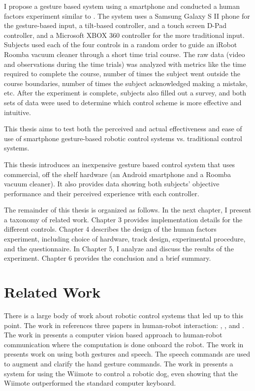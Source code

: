 \documentclass[12pt, letterpaper]{report}
\begin{document}
I propose a gesture based system using a smartphone and conducted a human factors experiment similar to \cite{Varcholik_Barber_Nicholson_2008}. The system uses a Samsung Galaxy S II phone for the gesture-based input, a tilt-based controller, and a touch screen D-Pad controller, and a Microsoft XBOX 360 controller for the more traditional input. Subjects used each of the four controls in a random order to guide an iRobot Roomba vacuum cleaner through a short time trial course. The raw data (video and observations during the time trials) was analyzed with metrics like the time required to complete the course, number of times the subject went outside the course boundaries, number of times the subject acknowledged making a mistake, etc. After the experiment is complete, subjects also filled out a survey, and both sets of data were used to determine which control scheme is more effective and intuitive. 

This thesis aims to test both the perceived and actual effectiveness and ease of use of smartphone gesture-based robotic control systems vs. traditional control systems.

This thesis introduces an inexpensive gesture based control system that uses commercial, off the shelf hardware (an Android smartphone and a Roomba vacuum cleaner). It also provides data showing both subjects' objective performance and their perceived experience with each controller.

The remainder of this thesis is organized as follows. In the next chapter, I present a taxonomy of related work. Chapter 3 provides implementation details for the different controls. Chapter 4 describes the design of the human factors experiment, including choice of hardware, track design, experimental procedure, and the questionnaire. In Chapter 5, I analyze and discuss the results of the experiment. Chapter 6 provides the conclusion and a brief summary. 

\chapter{Related Work}
There is a large body of work about robotic control systems that led up to this point.  The work in \cite{Varcholik_Barber_Nicholson_2008} references three papers in human-robot interaction: \cite{Waldherr}, \cite{Rogalla}, and \cite{Guo}. The work in \cite{Waldherr} presents a computer vision based approach to human-robot communication where the computation is done onboard the robot. The work in \cite{Rogalla} presents work on using both gestures and speech. The speech commands are used to augment and clarify the hand gesture commands. The work in \cite{Guo} presents a system for using the Wiimote to control a robotic dog, even showing that the Wiimote
outperformed the standard computer keyboard.
\end{document}
